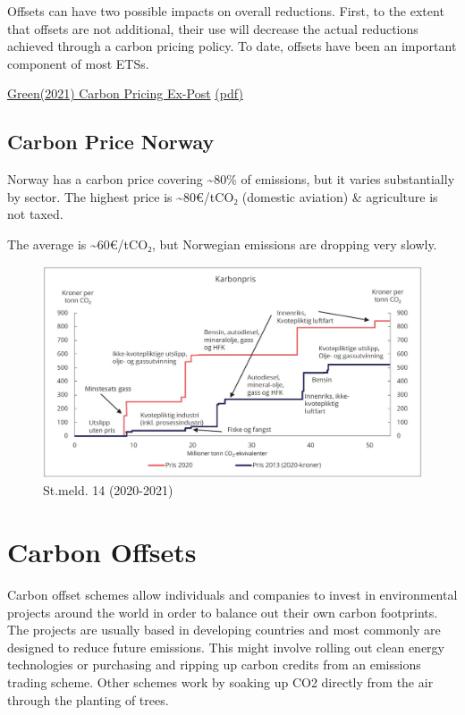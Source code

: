 \documentclass[
]{book}
\begin{document}
Offsets can have two possible impacts on overall reductions. First, to the extent that offsets are
not additional, their use will decrease the actual reductions achieved through a carbon pricing
policy.
To date, offsets have been an important component of most ETSs.

\href{https://iopscience.iop.org/article/10.1088/1748-9326/abdae9/meta}{Green(2021) Carbon Pricing Ex-Post}
\href{pdf/Green_2021_Carbon_Pricing_Ex-Post.pdf}{(pdf)}

\hypertarget{carbon-price-norway}{%
\section{Carbon Price Norway}\label{carbon-price-norway}}

Norway has a carbon price covering \textasciitilde80\% of emissions, but it varies substantially by sector. The highest price is \textasciitilde80€/tCO₂ (domestic aviation) \& agriculture is not taxed.

The average is \textasciitilde60€/tCO₂, but Norwegian emissions are dropping very slowly.

\begin{figure}
\centering
\includegraphics{fig/Norsk_Karbonpris_SM14_2021.jpeg}
\caption{St.meld. 14 (2020-2021)}
\end{figure}

\hypertarget{carbon-offsets}{%
\chapter{Carbon Offsets}\label{carbon-offsets}}

Carbon offset schemes allow individuals and companies to invest in environmental projects around the world in order to balance out their own carbon footprints. The projects are usually based in developing countries and most commonly are designed to reduce future emissions. This might involve rolling out clean energy technologies or purchasing and ripping up carbon credits from an emissions trading scheme. Other schemes work by soaking up CO2 directly from the air through the planting of trees.
\end{document}
